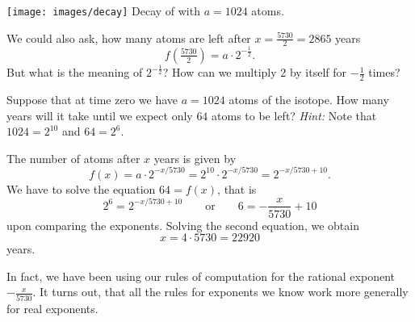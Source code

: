 \begin{minipage}{0.48\textwidth}
		\centering
		\texttt{[image: images/decay]}\hfill
		Decay of  with $a=1024$ atoms.
\end{minipage}
	We could also ask, how many  atoms are left after $x=\frac{5730}{2}=2865$ years
\begin{equation*}
	f\left(\tfrac{5730}{2}\right)=a\cdot 2^{-\frac{1}{2}}.
\end{equation*}
But what is the meaning of $2^{-\frac{1}{2}}$?
How can we multiply 2 by itself for $-\frac{1}{2}$ times?
\begin{exercise} \label{ex:c14}
	Suppose that at time zero we have $a=1024$ atoms of the  isotope.
	How many years will it take until we expect only $64$ atoms to be left?
	\textit{Hint:} Note that $1024=2^{10}$ and $64=2^6$.
\end{exercise}
\begin{solution*}
	The number of  atoms after $x$ years is given by
	\begin{equation*}
		f\left(x\right)=a\cdot 2^{-x/5730}=2^{10}\cdot 2^{-x/5730}=2^{-x/5730+10}.
	\end{equation*}
	We have to solve the equation $64=f\left(x\right)$, that is
	\begin{equation*}
		2^6=2^{-x/5730+10}\qquad\text{or}\qquad 6=-\frac{x}{5730}+10
	\end{equation*}
	upon comparing the exponents.
	Solving the second equation, we obtain
	\begin{equation*}
		x=4\cdot 5730=22920
	\end{equation*}
	years.
\end{solution*}
In fact, we have been using our rules of computation for the rational exponent $-\frac{x}{5730}$.
It turns out, that all the rules for exponents we know work more generally for real exponents.
